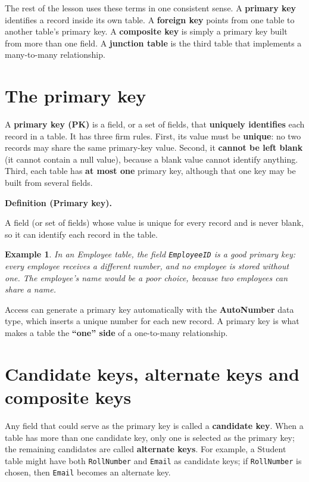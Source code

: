 \documentclass[11pt]{article}
\newtheorem{example}{Example}[section]
\newenvironment{definitionbox}[1]{%
  \par\noindent\textbf{Definition (#1).}\ \itshape
}{\par\vspace{0.3em}}
\begin{document}
The rest of the lesson uses these terms in one consistent sense. A
\textbf{primary key} identifies a record inside its own table. A
\textbf{foreign key} points from one table to another table's primary key. A
\textbf{composite key} is simply a primary key built from more than one field.
A \textbf{junction table} is the third table that implements a many-to-many
relationship.

\section{The primary key}
A \textbf{primary key (PK)} is a field, or a set of fields, that
\textbf{uniquely identifies} each record in a table. It has three firm rules.
First, its value must be \textbf{unique}: no two records may share the same
primary-key value. Second, it \textbf{cannot be left blank} (it cannot contain
a null value), because a blank value cannot identify anything. Third, each
table has \textbf{at most one} primary key, although that one key may be built
from several fields.

\begin{definitionbox}{Primary key}
A field (or set of fields) whose value is unique for every record and is never
blank, so it can identify each record in the table.
\end{definitionbox}

\begin{example}
In an Employee table, the field \texttt{EmployeeID} is a good primary key: every
employee receives a different number, and no employee is stored without one.
The employee's name would be a poor choice, because two employees can share a
name.
\end{example}

Access can generate a primary key automatically with the \textbf{AutoNumber}
data type, which inserts a unique number for each new record. A primary key is
what makes a table the \textbf{``one'' side} of a one-to-many relationship.

\section{Candidate keys, alternate keys and composite keys}
Any field that could serve as the primary key is called a \textbf{candidate
key}. When a table has more than one candidate key, only one is selected as
the primary key; the remaining candidates are called \textbf{alternate keys}.
For example, a Student table might have both \texttt{RollNumber} and
\texttt{Email} as candidate keys; if \texttt{RollNumber} is chosen, then
\texttt{Email} becomes an alternate key.
\end{document}
